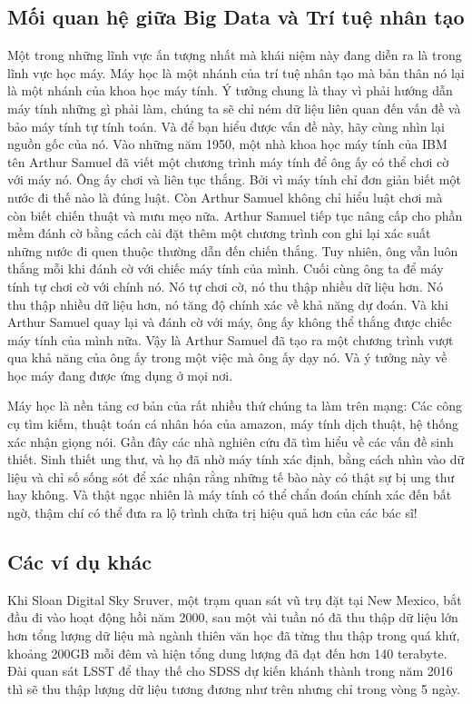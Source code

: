 \documentclass[12pt]{report}
\begin{document}
\subsection{Mối quan hệ giữa Big Data và Trí tuệ nhân tạo}
Một trong những lĩnh vực ấn tượng nhất mà khái niệm này đang diễn ra là trong lĩnh vực học máy. Máy học là một nhánh của trí tuệ nhân tạo mà bản thân nó lại là một nhánh của khoa học máy tính. Ý tưởng chung là thay vì phải hướng dẫn máy tính những gì phải làm, chúng ta sẽ chỉ ném dữ liệu liên quan đến vấn đề và bảo máy tính tự tính toán. Và để bạn hiểu được vấn đề này, hãy cùng nhìn lại nguồn gốc của nó. Vào những năm 1950, một nhà khoa học máy tính của IBM tên Arthur Samuel đã viết một chương trình máy tính để ông ấy có thể chơi cờ với máy nó. Ông ấy chơi và liên tục thắng. Bởi vì máy tính chỉ đơn giản biết một nước đi thế nào là đúng luật. Còn Arthur Samuel không chỉ hiểu luật chơi mà còn biết chiến thuật và mưu mẹo nữa. Arthur Samuel tiếp tục nâng cấp cho phần mềm đánh cờ bằng cách cài đặt thêm một chương trình con ghi lại xác suất những nước đi quen thuộc thường dẫn đến chiến thắng. Tuy nhiên, ông vẫn luôn thắng mỗi khi đánh cờ với chiếc máy tính của mình. Cuối cùng ông ta để máy tính tự chơi cờ với chính nó. Nó tự chơi cờ, nó thu thập nhiều dữ liệu hơn. Nó thu thập nhiều dữ liệu hơn, nó tăng độ chính xác về khả năng dự đoán. Và khi Arthur Samuel quay lại và đánh cờ với máy, ông ấy không thể thắng được chiếc máy tính của mình nữa. Vậy là Arthur Samuel đã tạo ra một chương trình vượt qua khả năng của ông ấy trong một việc mà ông ấy dạy nó. Và ý tưởng này về học máy đang được ứng dụng ở mọi nơi. 

Máy học là nền tảng cơ bản của rất nhiều thứ chúng ta làm trên mạng: Các công cụ tìm kiếm, thuật toán cá nhân hóa của amazon, máy tính dịch thuật, hệ thống xác nhận giọng nói. Gần đây các nhà nghiên cứu đã tìm hiểu về các vấn đề sinh thiết. Sinh thiết ung thư, và họ đã nhờ máy tính xác định, bằng cách nhìn vào dữ liệu và chỉ số sống sót để xác nhận rằng những tế bào này có thật sự bị ung thư hay không. Và thật ngạc nhiên là máy tính có thể chẩn đoán chính xác đến bất ngờ, thậm chí có thể đưa ra lộ trình chữa trị hiệu quả hơn của các bác sĩ!

\subsection{Các ví dụ khác}
Khi Sloan Digital Sky Sruver, một trạm quan sát vũ trụ đặt tại New Mexico, bắt đầu đi vào hoạt động hồi năm 2000, sau một vài tuần nó đã thu thập dữ liệu lớn hơn tổng lượng dữ liệu mà ngành thiên văn học đã từng thu thập trong quá khứ, khoảng 200GB mỗi đêm và hiện tổng dung lượng đã đạt đến hơn 140 terabyte. Đài quan sát LSST để thay thế cho SDSS dự kiến khánh thành trong năm 2016 thì sẽ thu thập lượng dữ liệu tương đương như trên nhưng chỉ trong vòng 5 ngày.
\end{document}
